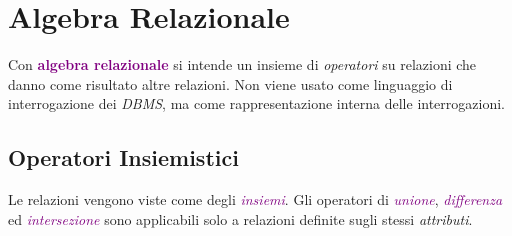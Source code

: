 \section{Algebra Relazionale}

\begin{definition}
    Con \textbf{\textcolor{purple}{algebra relazionale}} si intende un
    insieme di \emph{operatori} su relazioni che danno come risultato altre relazioni.
    Non viene usato come linguaggio di interrogazione dei \emph{DBMS}, ma come rappresentazione
    interna delle interrogazioni.
\end{definition}

\subsection{Operatori Insiemistici}
Le relazioni vengono viste come degli \emph{\textcolor{purple}{insiemi}}.
Gli operatori di \emph{\textcolor{purple}{unione}}, \emph{\textcolor{purple}{differenza}}
ed \emph{\textcolor{purple}{intersezione}} sono applicabili solo a relazioni
definite sugli stessi \emph{attributi}.
